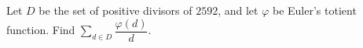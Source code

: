 Let $D$ be the set of positive divisors of $2592$, and let $\varphi$ be Euler's totient function. Find $\displaystyle\sum_{d\in D}\dfrac{\varphi(d)}{d}$.
